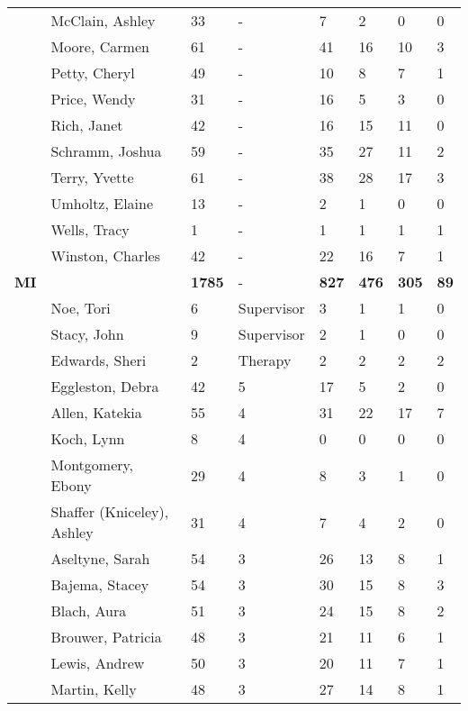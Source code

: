 \documentclass{article}\usepackage[]{graphicx}\usepackage[]{color}
\begin{document}
{\begin{longtable} { >{\raggedright}p{}p{}p{}p{}p{}p{}p{}p{}}
   \rowcolor[gray]{0.90} & McClain, Ashley & 33 & - & 7 & 2 & 0 & 0 \\ 
   \rowcolor[gray]{0.90} & Moore, Carmen & 61 & - & 41 & 16 & 10 & 3 \\ 
   \rowcolor[gray]{0.90} & Petty, Cheryl & 49 & - & 10 & 8 & 7 & 1 \\ 
   & Price, Wendy & 31 & - & 16 & 5 & 3 & 0 \\ 
   & Rich, Janet & 42 & - & 16 & 15 & 11 & 0 \\ 
   & Schramm, Joshua & 59 & - & 35 & 27 & 11 & 2 \\ 
   \rowcolor[gray]{0.90} & Terry, Yvette & 61 & - & 38 & 28 & 17 & 3 \\ 
   \rowcolor[gray]{0.90} & Umholtz, Elaine & 13 & - & 2 & 1 & 0 & 0 \\ 
   \rowcolor[gray]{0.90} & Wells, Tracy & 1 & - & 1 & 1 & 1 & 1 \\ 
   & Winston, Charles & 42 & - & 22 & 16 & 7 & 1 \\ 
   \hline
\textbf{MI} &  & \textbf{1785} & - & \textbf{827} & \textbf{476} & \textbf{305} & \textbf{89} \\ 
   & Noe, Tori & 6 & Supervisor & 3 & 1 & 1 & 0 \\ 
   \rowcolor[gray]{0.90} & Stacy, John & 9 & Supervisor & 2 & 1 & 0 & 0 \\ 
   \rowcolor[gray]{0.90} & Edwards, Sheri & 2 & Therapy & 2 & 2 & 2 & 2 \\ 
   \rowcolor[gray]{0.90} & Eggleston, Debra & 42 & 5 & 17 & 5 & 2 & 0 \\ 
   & Allen, Katekia & 55 & 4 & 31 & 22 & 17 & 7 \\ 
   & Koch, Lynn & 8 & 4 & 0 & 0 & 0 & 0 \\ 
   & Montgomery, Ebony & 29 & 4 & 8 & 3 & 1 & 0 \\ 
   \rowcolor[gray]{0.90} & Shaffer (Kniceley), Ashley & 31 & 4 & 7 & 4 & 2 & 0 \\ 
   \rowcolor[gray]{0.90} & Aseltyne, Sarah & 54 & 3 & 26 & 13 & 8 & 1 \\ 
   \rowcolor[gray]{0.90} & Bajema, Stacey & 54 & 3 & 30 & 15 & 8 & 3 \\ 
   & Blach, Aura & 51 & 3 & 24 & 15 & 8 & 2 \\ 
   & Brouwer, Patricia & 48 & 3 & 21 & 11 & 6 & 1 \\ 
   & Lewis, Andrew & 50 & 3 & 20 & 11 & 7 & 1 \\ 
   \rowcolor[gray]{0.90} & Martin, Kelly & 48 & 3 & 27 & 14 & 8 & 1 \\ 

\end{longtable}}
\end{document}
